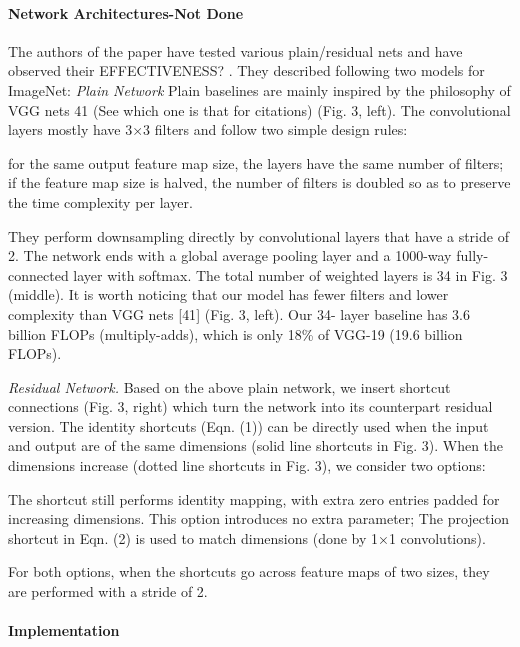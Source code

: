 \documentclass[
]{krantz}
\begin{document}
\hypertarget{network-architectures-not-done}{%
\paragraph{Network Architectures-Not Done}\label{network-architectures-not-done}}

The authors of the paper have tested various plain/residual nets and have observed their EFFECTIVENESS? . They described following two models for ImageNet:
\emph{Plain Network} Plain baselines are mainly inspired by the philosophy of VGG nets 41 (See which one is that for citations) (Fig. 3, left). The convolutional layers mostly have 3×3 filters and follow two simple design rules:

for the same output feature map size, the layers have the same number of filters;
if the feature map size is halved, the number of filters is doubled so as to preserve the time complexity per layer.

They perform downsampling directly by convolutional layers that have a stride of 2. The network ends with a global average pooling layer and a 1000-way fully-connected layer with softmax. The total number of weighted layers is 34 in Fig. 3 (middle).
It is worth noticing that our model has fewer filters and lower complexity than VGG nets {[}41{]} (Fig. 3, left). Our 34- layer baseline has 3.6 billion FLOPs (multiply-adds), which is only 18\% of VGG-19 (19.6 billion FLOPs).

\emph{Residual Network.} Based on the above plain network, we insert shortcut connections (Fig. 3, right) which turn the network into its counterpart residual version. The identity shortcuts (Eqn. (1)) can be directly used when the input and output are of the same dimensions (solid line shortcuts in Fig. 3). When the dimensions increase (dotted line shortcuts in Fig. 3), we consider two options:

The shortcut still performs identity mapping, with extra zero entries padded for increasing dimensions. This option introduces no extra parameter;
The projection shortcut in Eqn. (2) is used to match dimensions (done by 1×1 convolutions).

For both options, when the shortcuts go across feature maps of two sizes, they are performed with a stride of 2.

\hypertarget{implementation}{%
\paragraph{Implementation}\label{implementation}}
\end{document}
